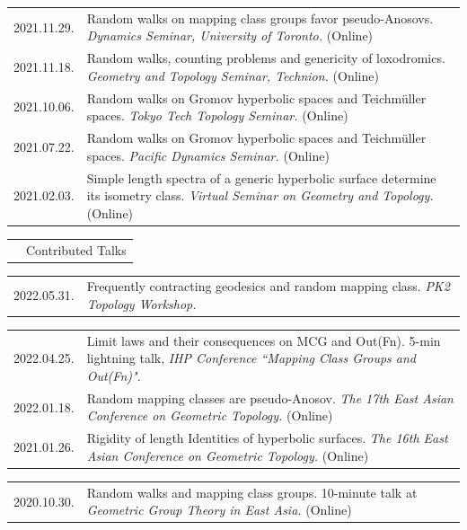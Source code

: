\documentclass[a4paper, 10pt]{article}
\begin{document}
\begin{tabular}{Q{2.45cm}P{13cm}}
\small{2021.11.29.} &  Random walks on mapping class groups favor pseudo-Anosovs. \textit{Dynamics Seminar, University of Toronto.} (Online) \\
\small{2021.11.18.} &  Random walks, counting problems and genericity of loxodromics. \textit{Geometry and Topology Seminar, Technion.} (Online) \\
\small{2021.10.06.} & Random walks on Gromov hyperbolic spaces and Teichmüller spaces. \textit{Tokyo Tech Topology Seminar.} (Online) \\
\small{2021.07.22.} & Random walks on Gromov hyperbolic spaces and Teichmüller spaces. \textit{Pacific Dynamics Seminar.} (Online) \\
\small{2021.02.03.} & Simple length spectra of a generic hyperbolic surface determine its isometry class. \textit{Virtual Seminar on Geometry and Topology.} (Online)
\end{tabular}
\vspace{0.6cm}

\begin{tabular}{Q{2.45cm}P{13cm}}
&{\large Contributed Talks}
\end{tabular}
\vspace{6pt}

\begin{tabular}{Q{2.45cm}P{13cm}}
\small{2022.05.31.} & Frequently contracting geodesics and random mapping class. \textit{PK2 Topology Workshop.} \\
\end{tabular}

\begin{tabular}{Q{2.45cm}P{13cm}}
\small{2022.04.25.} & Limit laws and their consequences on MCG and Out(Fn). 5-min lightning talk, \textit{IHP Conference ``Mapping Class Groups and Out(Fn)".} \\
\small{2022.01.18. } & Random mapping classes are pseudo-Anosov. \textit{The 17th East Asian Conference on Geometric Topology.} (Online)\\
\small{2021.01.26.} & Rigidity of length Identities of hyperbolic surfaces. \textit{The 16th East Asian Conference on Geometric Topology.} (Online)\\
\end{tabular}

\begin{tabular}{Q{2.45cm}P{13cm}}
\small{2020.10.30.} & Random walks and mapping class groups. 10-minute talk at \textit{Geometric Group Theory in East Asia.} (Online)
\end{tabular}
\end{document}
